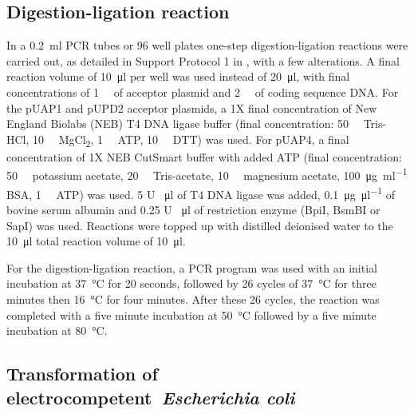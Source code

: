 \documentclass[../main.tex]{subfiles}
\begin{document}
\subsection{Digestion-ligation reaction}\label{chapter2:methods:digestion-ligation-reaction}

In a \SI{0.2}{\milli\litre} PCR tubes or 96 well plates one-step digestion-ligation reactions were carried out, as detailed in Support Protocol 1 in \textcite*{patronDNAAssemblyPlant2016}, with a few alterations.
A final reaction volume of \SI{10}{\micro\litre} per well was used instead of \SI{20}{\micro\litre}, with final concentrations of \SI{1}{\nano\Molar} of acceptor
plasmid and \SI{2}{\nano\Molar} of coding sequence DNA.
For the pUAP1 and pUPD2 acceptor plasmids, a 1X final concentration of New England Biolabs (NEB) T4 DNA ligase buffer (final concentration: \SI{50}{\milli\Molar} Tris-HCl, \SI{10}{\milli\Molar} MgCl\textsubscript{2}, \SI{1}{\milli\Molar} ATP, \SI{10}{\milli\Molar} DTT) was used.
For pUAP4, a final concentration of 1X NEB CutSmart buffer with added ATP (final concentration: \SI{50}{\milli\Molar} potassium acetate, \SI{20}{\milli\Molar} Tris-acetate, \SI{10}{\milli\Molar} magnesium acetate, \SI{100}{\micro\gram\per\ml} BSA, \SI{1}{\milli\Molar} ATP) was used.
5 U \si{\per\ul} of T4 DNA ligase was added, \SI{0.1}{\micro\gram\per\ul} of bovine serum albumin and 0.25 U \si{\per\micro\litre} of restriction enzyme (BpiI, BsmBI or SapI) was used. Reactions were topped up with distilled deionised water to the \SI{10}{\micro\litre} total reaction volume of \SI{10}{\micro\litre}.

For the digestion-ligation reaction, a PCR program was used with an initial incubation at \SI{37}{\degreeCelsius} for 20 seconds, followed by 26 cycles of \SI{37}{\degreeCelsius} for three minutes then \SI{16}{\degreeCelsius} for four minutes.
After these 26 cycles, the reaction was completed with a five minute incubation at \SI{50}{\degreeCelsius} followed by a five minute incubation at \SI{80}{\degreeCelsius}.

\subsection{Transformation of electrocompetent~\textit{Escherichia coli}}\label{chapter2:methods:transformation-of-electrocompetent-escherichia-coli}
\end{document}
